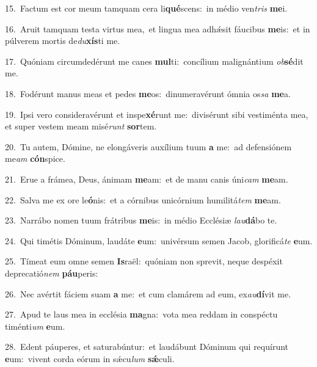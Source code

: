 {\numbfont\textcolor{\numbcolor}{15.}}~Factum est cor meum tamquam cera li\-\textbf{qué}\-scens:~\star in médio ven\textit{tris} \textbf{me}\-i.\par
{\numbfont\textcolor{\numbcolor}{16.}}~Aruit tamquam testa virtus mea,~\dagger et lingua mea adhǽsit fáucibus \textbf{me}\-is:~\star et in púlverem mortis de\-\textit{du}\-\textbf{xís}ti me.\par
{\numbfont\textcolor{\numbcolor}{17.}}~Quóniam circumdedérunt me canes \textbf{mul}\-ti:~\star concílium malignántium \textit{ob}\-\textbf{sé}dit me.\par
{\numbfont\textcolor{\numbcolor}{18.}}~Fodérunt manus meas et pedes \textbf{me}\-os:~\star dinumeravérunt ómnia os\textit{sa} \textbf{me}\-a.\par
{\numbfont\textcolor{\numbcolor}{19.}}~Ipsi vero consideravérunt et inspe\-\textbf{xé}\-runt me:~\star divisérunt sibi vestiménta mea, et super vestem meam misé\textit{runt} \textbf{sor}\-tem.\par
{\numbfont\textcolor{\numbcolor}{20.}}~Tu autem, Dómine, ne elongáveris auxílium tuum \textbf{a} me:~\star ad defensiónem me\textit{am} \textbf{cón}\-spice.\par
{\numbfont\textcolor{\numbcolor}{21.}}~Erue a frámea, Deus, ánimam \textbf{me}\-am:~\star et de manu canis úni\textit{cam} \textbf{me}\-am.\par
{\numbfont\textcolor{\numbcolor}{22.}}~Salva me ex ore le\-\textbf{ó}\-nis:~\star et a córnibus unicórnium humilitá\textit{tem} \textbf{me}\-am.\par
{\numbfont\textcolor{\numbcolor}{23.}}~Narrábo nomen tuum frátribus \textbf{me}\-is:~\star in médio Ecclésiæ \textit{lau}\-\textbf{dá}bo te.\par
{\numbfont\textcolor{\numbcolor}{24.}}~Qui timétis Dóminum, laudáte \textbf{e}\-um:~\star univérsum semen Jacob, glorificá\textit{te} \textbf{e}\-um.\par
{\numbfont\textcolor{\numbcolor}{25.}}~Tímeat eum omne semen \textbf{Is}\-raël:~\star quóniam non sprevit, neque despéxit deprecatió\textit{nem} \textbf{páu}\-peris:\par
{\numbfont\textcolor{\numbcolor}{26.}}~Nec avértit fáciem suam \textbf{a} me:~\star et cum clamárem ad eum, ex\-\textit{au}\-\textbf{dí}vit me.\par
{\numbfont\textcolor{\numbcolor}{27.}}~Apud te laus mea in ecclésia \textbf{ma}\-gna:~\star vota mea reddam in conspéctu timénti\textit{um} \textbf{e}\-um.\par
{\numbfont\textcolor{\numbcolor}{28.}}~Edent páuperes, et saturabúntur:~\dagger et laudábunt Dóminum qui requírunt \textbf{e}\-um:~\star vivent corda eórum in sǽcu\textit{lum} \textbf{sǽ}\-culi.\par
